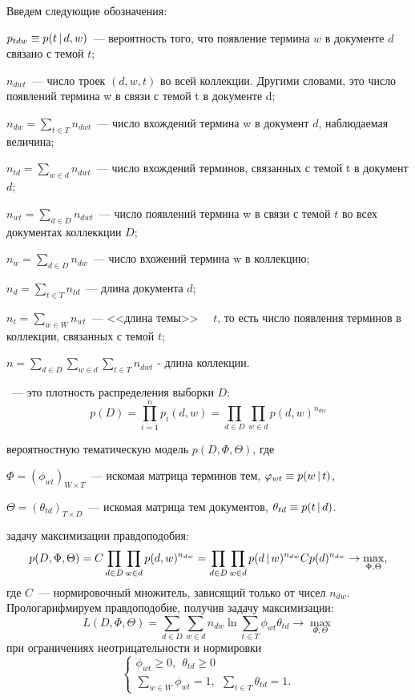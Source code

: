 \documentclass[12pt, twoside]{article}
\begin{document}
Введем следующие обозначения:

$p_{tdw} \equiv p(t \mspace{3mu}{|}\mspace{3mu} d,w)$~--- вероятность того, что появление термина $w$ в документе $d$ связано с темой $t$;

$n_{dwt}$~--- число троек $(d,w,t)$ во всей коллекции. Другими словами, это число появлений термина w в связи с темой t в документе d;

$n_{dw} = \sum_{t \in T} n_{dwt}$~--- число вхождений термина w в документ $d$,  наблюдаемая величина;

$n_{td} = \sum_{w \in d} n_{dwt}$~--- число вхождений  терминов, связанных с темой t в документ $d$;

$n_{wt} = \sum_{d \in D} n_{dwt}$~--- число появлений термина w в связи с темой $t$ во всех документах коллеккции $D$;

$n_{w} = \sum_{d \in D} n_{dw}$~--- число вхожений термина w в коллекцию;

$n_{d} = \sum_{t \in T} n_{td}$~--- длина документа $d$;

$n_{t} = \sum_{w \in W} n_{wt}$~--- <<длина темы>> \ \ $t$, то есть число появления терминов в коллекции, связанных с темой $t$;

$n = \sum_{d \in D}\sum_{w \in d}\sum_{t \in T} n_{dwt}$ - длина коллекции.

~---  это плотность распределения выборки $D$:
\[
p(D)=\prod^n_{i=1}p_i(d,w)=\prod_{d \in D}\prod_{w \in d}p(d,w)^{n_{dw}}
\]

 вероятностную тематическую модель $p(D,\Phi,\Theta)$, где 

$\Phi=(\phi_{wt})_{W \times T}$~--- искомая матрица терминов тем, $\varphi_{wt} \equiv p(w \mspace{3mu}{|}\mspace{3mu} t)$,

$\Theta=(\theta_{td})_{T \times D}$~--- искомая матрица тем документов, $\theta_{td}\equiv p(t \mspace{3mu}{|}\mspace{3mu} d)$.

 задачу максимизации правдоподобия:
\[
p(D,\Phi,\Theta)=C\prod_{d \in D}\prod_{w \in d}p(d,w)^{n_{dw}}=\prod_{d \in D}\prod_{w \in d}p(d \cond w)^{n_{dw}}Cp(d)^{n_{dw}} \to \max_{\Phi,\Theta},
\]
где $C$~--- нормировочный множитель, зависящий только от чисел $n_{dw}$. Прологарифмируем правдоподобие, получив задачу максимизации:
\[
L(D,\Phi,\Theta)=\sum_{d \in D}\sum_{w \in d}n_{dw}\ln\sum_{t \in T}\phi_{wt}\theta_{td} \to \max_{\Phi,\Theta}
\]
при ограничениях неотрицательности и нормировки
\[
\left\{
	\begin{aligned}
		\phi_{wt} \geq 0,~~\theta_{td} \geq 0\\
		\sum_{w \in W} \phi_{wt} = 1,~~\sum_{t \in T} \theta_{td}  = 1.
	\end{aligned}
\right.
\]
\end{document}
